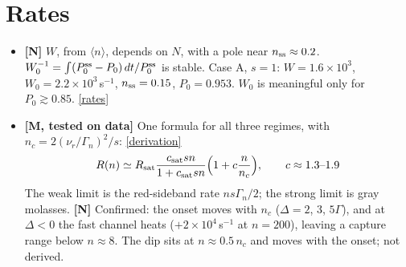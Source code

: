 \documentclass[10pt,a4paper]{article}
\newcommand{\more}[2]{\href{report.pdf\##1}{[#2]}}
\begin{document}
\section*{Rates}
\begin{itemize}
\item \textbf{[N]} $W$, from $\langle n\rangle$, depends on $N$, with a pole near $n_{\rm ss}\approx0.2$. $W_0^{-1}=\int(P_0^{\rm ss}-P_0)\,dt/P_0^{\rm ss}$ is stable. Case A, $s=1$: $W=1.6\times10^3$, $W_0=2.2\times10^3\,$s$^{-1}$, $n_{\rm ss}=0.15$, $P_0=0.953$. $W_0$ is meaningful only for $P_0\gtrsim0.85$. \more{d:W0}{rates}
\item \textbf{[M, tested on data]} One formula for all three regimes, with $n_c=2(\nu_r/\Gamma_n)^2/s$: \more{d:regimes}{derivation}
\begin{equation*}
  R(n)\simeq R_{\rm sat}\frac{c_{\rm sat}sn}{1+c_{\rm sat}sn}\Big(1+c\frac{n}{n_c}\Big),\qquad c\approx1.3\text{--}1.9
\end{equation*}
The weak limit is the red-sideband rate $ns\Gamma_n/2$; the strong limit is gray molasses. \textbf{[N]} Confirmed: the onset moves with $n_c$ ($\Delta=2$, 3, $5\Gamma$), and at $\Delta<0$ the fast channel heats ($+2\times10^4\,$s$^{-1}$ at $n=200$), leaving a capture range below $n\approx8$. The dip sits at $n\approx0.5\,n_c$ and moves with the onset; not derived.
\end{itemize}
\end{document}
